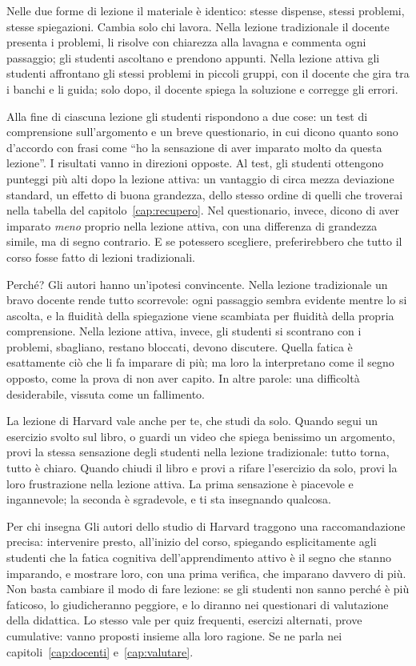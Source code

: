 Nelle due forme di lezione il materiale è identico: stesse dispense,
stessi problemi, stesse spiegazioni. Cambia solo chi lavora. Nella
lezione tradizionale il docente presenta i problemi, li risolve con
chiarezza alla lavagna e commenta ogni passaggio; gli studenti
ascoltano e prendono appunti. Nella lezione attiva gli studenti
affrontano gli stessi problemi in piccoli gruppi, con il docente che
gira tra i banchi e li guida; solo dopo, il docente spiega la
soluzione e corregge gli errori.

Alla fine di ciascuna lezione gli studenti rispondono a due cose: un
test di comprensione sull'argomento e un breve questionario, in cui
dicono quanto sono d'accordo con frasi come \enquote{ho la sensazione
di aver imparato molto da questa lezione}. I risultati vanno in
direzioni opposte. Al test, gli studenti ottengono punteggi più alti
dopo la lezione attiva: un vantaggio di circa mezza deviazione
standard, un effetto di buona grandezza, dello stesso ordine di quelli
che troverai nella tabella del capitolo~\ref{cap:recupero}. Nel questionario, invece,
dicono di aver imparato \emph{meno} proprio nella lezione attiva, con
una differenza di grandezza simile, ma di segno contrario. E se
potessero scegliere, preferirebbero che tutto il corso fosse fatto di
lezioni tradizionali.

Perché? Gli autori hanno un'ipotesi convincente. Nella lezione
tradizionale un bravo docente rende tutto scorrevole: ogni passaggio
sembra evidente mentre lo si ascolta, e la fluidità della spiegazione
viene scambiata per fluidità della propria comprensione. Nella lezione
attiva, invece, gli studenti si scontrano con i problemi, sbagliano,
restano bloccati, devono discutere. Quella fatica è esattamente ciò
che li fa imparare di più; ma loro la interpretano come il segno
opposto, come la prova di non aver capito. In altre parole: una
difficoltà desiderabile, vissuta come un fallimento.

La lezione di Harvard vale anche per te, che studi da solo. Quando segui
un esercizio svolto sul libro, o guardi un video che spiega benissimo
un argomento, provi la stessa sensazione degli studenti nella lezione
tradizionale: tutto torna, tutto è chiaro. Quando chiudi il libro e
provi a rifare l'esercizio da solo, provi la loro frustrazione nella
lezione attiva. La prima sensazione è piacevole e ingannevole; la
seconda è sgradevole, e ti sta insegnando qualcosa.

\begin{riquadro}{Per chi insegna}
Gli autori dello studio di Harvard traggono una raccomandazione precisa:
intervenire presto, all'inizio del corso, spiegando esplicitamente agli
studenti che la fatica cognitiva dell'apprendimento attivo è il segno
che stanno imparando, e mostrare loro, con una prima verifica, che
imparano davvero di più. Non basta cambiare il modo di fare lezione: se
gli studenti non sanno perché è più faticoso, lo giudicheranno peggiore,
e lo diranno nei questionari di valutazione della didattica. Lo stesso
vale per quiz frequenti, esercizi alternati, prove cumulative: vanno
proposti insieme alla loro ragione. Se ne parla nei
capitoli~\ref{cap:docenti} e~\ref{cap:valutare}.
\end{riquadro}

